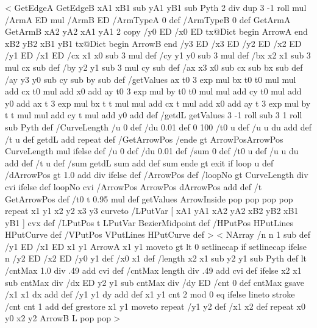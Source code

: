 %
<{%
	GetEdgeA GetEdgeB
	xA1 xB1 sub yA1 yB1 sub
	Pyth 2 div dup 3 -1 roll mul
	/ArmA ED
	mul
	/ArmB ED
	/ArmTypeA 0 def
	/ArmTypeB 0 def
	GetArmA GetArmB
	xA2 yA2 xA1 yA1
	2 copy
	/y0 ED /x0 ED
	tx@Dict begin
		ArrowA
	end
	xB2 yB2 xB1 yB1
	tx@Dict begin
		ArrowB
	end
	/y3 ED /x3 ED /y2 ED /x2 ED /y1 ED /x1 ED
	/cx x1 x0 sub 3 mul def
	/cy y1 y0 sub 3 mul def
	/bx x2 x1 sub 3 mul cx sub def
	/by y2 y1 sub 3 mul cy sub def
	/ax x3 x0 sub cx sub bx sub def
	/ay y3 y0 sub cy sub by sub def
	/getValues {
		ax t0 3 exp mul bx t0 t0 mul mul add cx t0 mul add x0 add
		ay t0 3 exp mul by t0 t0 mul mul add cy t0 mul add y0 add
		ax t 3 exp mul bx t t mul mul add cx t mul add x0 add
	ay t 3 exp mul by t t mul mul add cy t mul add y0 add
	} def
	/getdL {
		getValues
		3 -1 roll sub 3 1 roll sub Pyth
	} def
	/CurveLength {
		/u 0 def
		/du 0.01 def
		0 100 {
			/t0 u def
			/u u du add def
			/t u def
			getdL add
		} repeat } def
	/GetArrowPos {
		/ende \psk@ArrowInsidePos{} gt {ArrowPos}{ArrowPos CurveLength mul} ifelse def
		/u 0 def
		/du 0.01 def
		/sum 0 def
		{
			/t0 u def
			/u u du add def
			/t u def
			/sum getdL sum add def
			sum ende gt {exit} if
		} loop u
	} def
	/dArrowPos  gt {%
		1.0  add div
	}{ \psk@ArrowInsidePos } ifelse def
	/ArrowPos \psk@ArrowInsideOffset\space def
	/loopNo \psk@ArrowInsidePos{} gt {%
		CurveLength \psk@ArrowInsidePos\space div cvi
		}{ \psk@ArrowInsideNo } ifelse def
	loopNo cvi {
		/ArrowPos ArrowPos dArrowPos add def
		/t GetArrowPos def
		/t0 t 0.95 mul def
		getValues
		ArrowInside pop pop pop pop
	} repeat
	x1 y1 x2 y2 x3 y3 curveto
	/LPutVar [ xA1 yA1 xA2 yA2 xB2 yB2 xB1 yB1 ] cvx def
	/LPutPos { t LPutVar BezierMidpoint } def
	/HPutPos { { HPutLines } HPutCurve } def
	/VPutPos { { VPutLines } HPutCurve } def
}>
%
%
%
<{%
	NArray
	/n n 1 sub def
	/y1 ED /x1 ED x1 y1 ArrowA x1 y1 moveto
	\psk@linecap{} gt
		{\psk@linecap{} lt {0 setlinecap} if }
		{\psk@linecap\space setlinecap} ifelse
	n {
		/y2 ED /x2 ED
		/y0 y1 def /x0 x1 def
		/length x2 x1 sub y2 y1 sub Pyth def
		\psk@dashNo{} lt
			{/cntMax 1.0 \psk@dashNo\space div .49 add cvi def}
			{/cntMax length \psk@dashNo\space div .49 add cvi def} ifelse
		x2 x1 sub cntMax div /dx ED
		y2 y1 sub cntMax div /dy ED
		/cnt 0 def
		cntMax {
			gsave
			/x1 x1 dx add def
			/y1 y1 dy add def
			x1 y1
			cnt 2 mod 0 eq
				{ \pst@usecolor\psDashColorI }
				{ \pst@usecolor\psDashColorII } ifelse
			lineto stroke
			/cnt cnt 1 add def
			grestore
			x1 y1 moveto
		} repeat
		/y1 y2 def /x1 x2 def
	} repeat
	x0 y0 x2 y2 ArrowB L pop pop
}>
